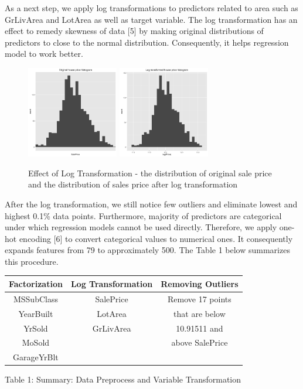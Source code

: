 \documentclass[letterpaper, 10 pt, conference]{ieeeconf}\usepackage[]{graphicx}\usepackage[]{color}
\begin{document}
As a next step, we apply log transformations to predictors related to area such as GrLivArea and LotArea as well as target variable. The log transformation has an effect to remedy skewness of data [5] by making original distributions of predictors to close to the normal distribution. Consequently, it helps regression model to work better.

   \begin{figure}[thpb]
      \centering
      \includegraphics[width =  4cm, height = 4cm]{../images/historgram_original_price.png}
      \includegraphics[width =  4cm, height = 4cm]{../images/historgram_log_trasformed_price.png}
      \caption{Effect of Log Transformation - the distribution of original sale price and the distribution of sales price after log transformation}
      \label{figurelabel}
   \end{figure}
   
After the log transformation, we still notice few outliers and eliminate lowest and highest 0.1\% data points. Furthermore, majority of predictors are categorical under which regression models cannot be used directly. Therefore, we apply one-hot encoding [6] to convert categorical values to numerical ones. It consequently expands features from 79 to approximately 500. The Table 1 below summarizes this procedure.

\begin{center}
\centering
\begin{tabular}{ | c | c | c |}
  \hline			
  Factorization & Log Transformation & Removing Outliers \\
  \hline  
  MSSubClass & SalePrice & Remove 17 points \\
  YearBuilt & LotArea & that are below \\
  YrSold & GrLivArea & 10.91511 and \\ 
  MoSold & & above SalePrice\\
  GarageYrBlt & & \\
  \hline  
\end{tabular}
\end{center}
Table 1: Summary: Data Preprocess and Variable Transformation
\end{document}
